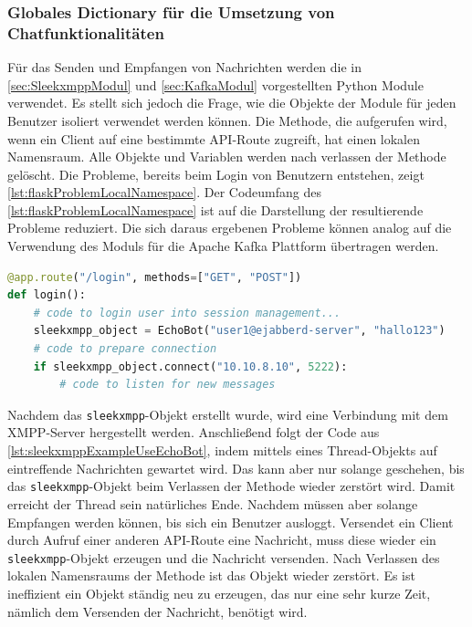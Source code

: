 \documentclass[a4paper,titlepage,halfparskip,12pt]{scrreprt}
\begin{document}
\begin{onehalfspacing}
\subsubsection*{Globales Dictionary für die Umsetzung von Chatfunktionalitäten}

Für das Senden und Empfangen von Nachrichten werden die in \autoref{sec:SleekxmppModul} und \autoref{sec:KafkaModul} vorgestellten Python Module verwendet. Es stellt sich jedoch die Frage, wie die Objekte der Module für jeden Benutzer isoliert verwendet werden können. Die Methode, die aufgerufen wird, wenn ein Client auf eine bestimmte \acs{API}-Route zugreift, hat einen lokalen Namensraum. Alle Objekte und Variablen werden nach verlassen der Methode gelöscht. Die Probleme, bereits beim Login von Benutzern entstehen, zeigt \autoref{lst:flaskProblemLocalNamespace}. Der Codeumfang des \autoref{lst:flaskProblemLocalNamespace} ist auf die Darstellung der resultierende Probleme reduziert. Die sich daraus ergebenen Probleme können analog auf die Verwendung des Moduls für die Apache Kafka Plattform übertragen werden.

\begin{lstlisting}[language=python, caption={Problem für Chatfunktionalitäten aufgrund des lokalen Namensraums von Methoden}, label={lst:flaskProblemLocalNamespace}]
@app.route("/login", methods=["GET", "POST"])
def login():
	# code to login user into session management...
	sleekxmpp_object = EchoBot("user1@ejabberd-server", "hallo123")
	# code to prepare connection
	if sleekxmpp_object.connect("10.10.8.10", 5222):
		# code to listen for new messages
\end{lstlisting}

Nachdem das \texttt{sleekxmpp}-Objekt erstellt wurde, wird eine Verbindung mit dem \acs{XMPP}-Server hergestellt werden. Anschließend folgt der Code aus \autoref{lst:sleekxmppExampleUseEchoBot}, indem mittels eines Thread-Objekts auf eintreffende Nachrichten gewartet wird. Das kann aber nur solange geschehen, bis das \texttt{sleekxmpp}-Objekt beim Verlassen der Methode wieder zerstört wird. Damit erreicht der Thread sein natürliches Ende. Nachdem müssen aber solange Empfangen werden können, bis sich ein Benutzer ausloggt. Versendet ein Client durch Aufruf einer anderen \acs{API}-Route eine Nachricht, muss diese wieder ein \texttt{sleekxmpp}-Objekt erzeugen und die Nachricht versenden. Nach Verlassen des lokalen Namensraums der Methode ist das Objekt wieder zerstört. Es ist ineffizient ein Objekt ständig neu zu erzeugen, das nur eine sehr kurze Zeit, nämlich dem Versenden der Nachricht, benötigt wird.


\end{onehalfspacing}
\end{document}
